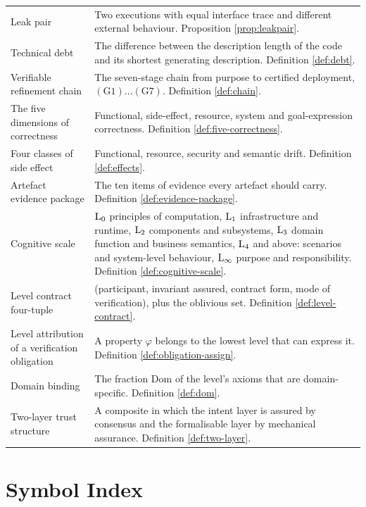 \begin{longtable}{L{3.4cm}L{11.0cm}}
Leak pair & Two executions with equal interface trace and different external behaviour.
  Proposition \ref{prop:leakpair}. \\
Technical debt & The difference between the description length of the code and its shortest
  generating description. Definition \ref{def:debt}. \\
Verifiable refinement chain & The seven-stage chain from purpose to certified deployment,
  $(\mathrm{G}1)\dots(\mathrm{G}7)$. Definition \ref{def:chain}. \\
The five dimensions of correctness & Functional, side-effect, resource, system and
  goal-expression correctness. Definition \ref{def:five-correctness}. \\
Four classes of side effect & Functional, resource, security and semantic drift.
  Definition \ref{def:effects}. \\
Artefact evidence package & The ten items of evidence every artefact should carry.
  Definition \ref{def:evidence-package}. \\
Cognitive scale & $\mathrm{L}_{0}$ principles of computation, $\mathrm{L}_{1}$ infrastructure and runtime,
  $\mathrm{L}_{2}$ components and subsystems, $\mathrm{L}_{3}$ domain function and business semantics,
  $\mathrm{L}_{4}$ and above: scenarios and system-level behaviour, $\mathrm{L}_{\infty}$ purpose and
  responsibility. Definition \ref{def:cognitive-scale}. \\
Level contract four-tuple & (participant, invariant assured, contract form, mode of
  verification), plus the oblivious set. Definition \ref{def:level-contract}. \\
Level attribution of a verification obligation & A property $\varphi$ belongs to the lowest
  level that can express it. Definition \ref{def:obligation-assign}. \\
Domain binding & The fraction $\mathrm{Dom}$ of the level's axioms that are
  domain-specific. Definition \ref{def:dom}. \\
Two-layer trust structure & A composite in which the intent layer is assured by consensus
  and the formalisable layer by mechanical assurance. Definition \ref{def:two-layer}. \\
\bottomrule
\end{longtable}

\section*{Symbol Index}

